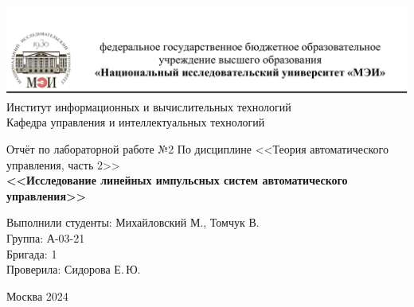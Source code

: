 \begin{titlepage}
	\newpage
	\begin{center}
		\includegraphics[width=\textwidth]{png/tit.png}
		Институт информационных и вычислительных технологий \\
			Кафедра управления и интеллектуальных технологий
		\vspace{1.25cm}
	\end{center}
	
	\vspace{1.2em}
	
	\begin{center}
		\begin{spacing}{1}
			{\Large Отчёт по лабораторной работе №2 \linebreak
			По дисциплине <<Теория автоматического управления, часть 2>> \\}
			\large{\bf<<Исследование линейных импульсных систем автоматического управления>>}
		\end{spacing}
	\end{center}
	
	\vspace{5em}
	

	\vspace{6em}
	
		\noindent Выполнили студенты: Михайловский М., Томчук В. \\
		Группа: А-03-21 \\
		Бригада: 1\\
		Проверила: Сидорова Е.\,Ю.
	
	
	\vspace{\fill}
	
	\begin{center}
		Москва 2024
	\end{center}
	
\end{titlepage}